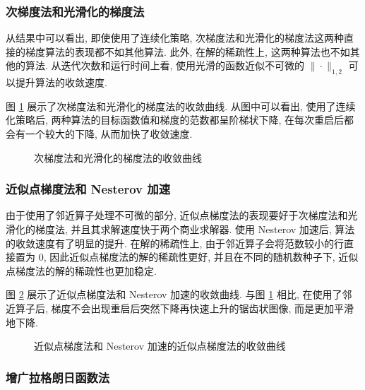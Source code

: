 \documentclass{article}
\begin{document}
\subsubsection{次梯度法和光滑化的梯度法}

从结果中可以看出, 即使使用了连续化策略, 次梯度法和光滑化的梯度法这两种直接的梯度算法的表现都不如其他算法. 此外, 在解的稀疏性上, 这两种算法也不如其他的算法. 从迭代次数和运行时间上看, 使用光滑的函数近似不可微的 $\|\cdot\|_{1,2}$ 可以提升算法的收敛速度.

图 \ref{fig:gd} 展示了次梯度法和光滑化的梯度法的收敛曲线. 从图中可以看出, 使用了连续化策略后, 两种算法的目标函数值和梯度的范数都呈阶梯状下降, 在每次重启后都会有一个较大的下降, 从而加快了收敛速度.

\begin{figure}[h]
    \centering
    \caption{次梯度法和光滑化的梯度法的收敛曲线}
    \label{fig:gd}
\end{figure}

\subsubsection{近似点梯度法和 Nesterov 加速}

由于使用了邻近算子处理不可微的部分, 近似点梯度法的表现要好于次梯度法和光滑化的梯度法, 并且其求解速度快于两个商业求解器. 使用 Nesterov 加速后, 算法的收敛速度有了明显的提升. 在解的稀疏性上, 由于邻近算子会将范数较小的行直接置为 0, 因此近似点梯度法的解的稀疏性更好, 并且在不同的随机数种子下, 近似点梯度法的解的稀疏性也更加稳定.

图 \ref{fig:prox} 展示了近似点梯度法和 Nesterov 加速的收敛曲线. 与图 \ref{fig:gd} 相比, 在使用了邻近算子后, 梯度不会出现重启后突然下降再快速上升的锯齿状图像, 而是更加平滑地下降.

\begin{figure}[h]
    \centering
    \caption{近似点梯度法和 Nesterov 加速的近似点梯度法的收敛曲线}
    \label{fig:prox}
\end{figure}

\subsubsection{增广拉格朗日函数法}
\end{document}
